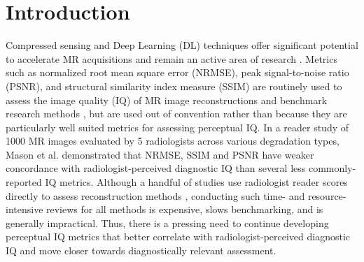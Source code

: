 \documentclass[AMA,STIX2COL,Linenumberson]{MRM}
\begin{document}

\maketitle
\section{Introduction}\label{intro}

Compressed sensing and Deep Learning (DL) techniques offer significant potential to accelerate MR acquisitions and remain an active area of research \cite{lustig2007sparse, sandino2020compressed, hammernik2021systematic, hammernik2018learning}. Metrics such as normalized root mean square error (NRMSE), peak signal-to-noise ratio (PSNR), and structural similarity index measure (SSIM) are routinely used to assess the image quality (IQ) of MR image reconstructions and benchmark research methods \cite{chen2022ai}, but are used out of convention rather than because they are particularly well suited metrics for assessing perceptual IQ. In a reader study of 1000 MR images evaluated by 5 radiologists across various degradation types, Mason et al. demonstrated that NRMSE, SSIM and PSNR have weaker concordance with radiologist-perceived diagnostic IQ \cite{mason2019comparison} than several less commonly-reported IQ metrics. Although a handful of studies use radiologist reader scores directly to assess reconstruction methods \cite{chaudhari2018super, chaudhari2020utility, mardani2018deep}, conducting such time- and resource-intensive reviews for all methods is expensive, slows benchmarking, and is generally impractical. Thus, there is a pressing need to continue developing perceptual IQ metrics that better correlate with radiologist-perceived diagnostic IQ and move closer towards diagnostically relevant assessment.
\end{document}
